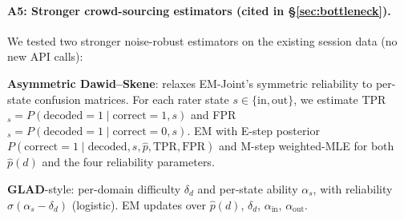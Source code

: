 \documentclass[11pt]{article}
\begin{document}
\paragraph{A5: Stronger crowd-sourcing estimators (cited in \S\ref{sec:bottleneck}).}
\label{app:ds_glad}
We tested two stronger noise-robust estimators on the existing session data (no new API calls):

\textbf{Asymmetric Dawid--Skene}: relaxes EM-Joint's symmetric reliability to per-state confusion matrices. For each rater state $s \in \{\text{in},\text{out}\}$, we estimate TPR$_s = P(\text{decoded}=1 \mid \text{correct}=1, s)$ and FPR$_s = P(\text{decoded}=1 \mid \text{correct}=0, s)$. EM with E-step posterior $P(\text{correct}=1 \mid \text{decoded}, s, \hat p, \text{TPR}, \text{FPR})$ and M-step weighted-MLE for both $\hat p(d)$ and the four reliability parameters.

\textbf{GLAD}-style: per-domain difficulty $\delta_d$ and per-state ability $\alpha_s$, with reliability $\sigma(\alpha_s - \delta_d)$ (logistic). EM updates over $\hat p(d)$, $\delta_d$, $\alpha_{\text{in}}$, $\alpha_{\text{out}}$.
\end{document}
